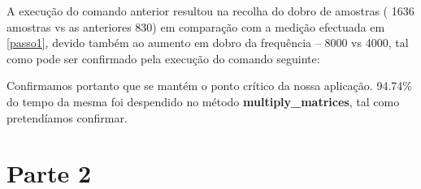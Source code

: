 \documentclass[conference,compsoc]{IEEEtran}
\begin{document}

                                                                                                                                                                                                                       A execução do comando anterior resultou na recolha do dobro de amostras ( 1636 amostras vs as anteriores 830) em comparação com a medição efectuada em \ref{passo1}, devido também ao aumento em dobro da frequência -- 8000 vs 4000, tal como pode ser confirmado pela execução do comando seguinte: 


                                                                                                                                                                                                                       Confirmamos portanto que se mantém o ponto crítico da nossa aplicação. 94.74\% do tempo da mesma foi despendido no método \textbf{multiply\_matrices}, tal como pretendíamos confirmar. 

                                                                                                                                                                                                                       \section{Parte 2 }
\end{document}

